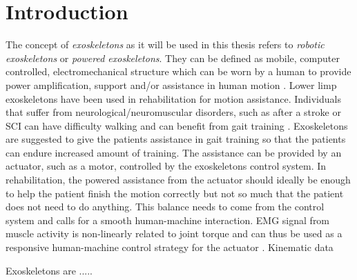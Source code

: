 \documentclass[../main.tex]{subfiles}
\begin{document}
\chapter{Introduction}
The concept of \textit{exoskeletons} as it will be used in this thesis refers to \textit{robotic exoskeletons} or \textit{powered exoskeletons}. 
They can be defined as mobile, computer controlled, electromechanical structure which can be worn by a human to provide power amplification, support and/or assistance in human motion \cite{Anam2012, Gorgey2018}. 
Lower limp exoskeletons have been used in rehabilitation for motion assistance.
Individuals that suffer from neurological/neuromuscular disorders, such as after a stroke or \ac{SCI} can have difficulty walking and can benefit from gait training \cite{Gorgey2018, Young2017, Lerner2017}.
Exoskeletons are suggested to give the patients assistance in gait training so that the patients can endure increased amount of training.
The assistance can be provided by an actuator, such as a motor, controlled by the exoskeletons control system.
In rehabilitation, the powered assistance from the actuator should ideally be enough to help the patient finish the motion correctly but not so much that the patient does not need to do anything.
This balance needs to come from the control system and calls for a smooth human-machine interaction.
\ac{EMG} signal from muscle activity is non-linearly related to joint torque and can thus be used as a responsive human-machine control strategy for the actuator \cite{Young2017}.
Kinematic data 

Exoskeletons are .....



\end{document}
